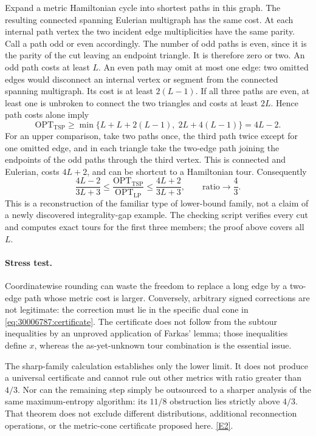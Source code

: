 \documentclass[11pt,a4paper]{article}
\newcommand{\eref}[2]{\hyperlink{extra:#1:#2}{[E#2]}}
\numberwithin{equation}{section}
\begin{document}
Expand a metric Hamiltonian cycle into shortest paths in this graph.
The resulting connected spanning Eulerian multigraph has the same
cost. At each internal path vertex the two incident edge multiplicities
have the same parity. Call a path odd or even accordingly.
The number of odd paths is even, since it is the parity of the cut
leaving an endpoint triangle. It is therefore zero or two.
An odd path costs at least $L$. An even path may omit at most one
edge: two omitted edges would disconnect an internal vertex or segment
from the connected spanning multigraph. Its cost is at least
$2(L-1)$. If all three paths are even, at least one is unbroken to
connect the two triangles and costs at least $2L$. Hence path costs
alone imply
\[
 \mathrm{OPT}_{\mathrm{TSP}}\ge
 \min\{L+L+2(L-1),\;2L+4(L-1)\}=4L-2.
\]
For an upper comparison, take two paths once, the third path twice
except for one omitted edge, and in each triangle take the two-edge
path joining the endpoints of the odd paths through the third vertex.
This is connected and Eulerian, costs $4L+2$, and can be shortcut to
a Hamiltonian tour. Consequently
\begin{equation}\label{eq:30006787:limit}
 \frac{4L-2}{3L+3}\le
 \frac{\mathrm{OPT}_{\mathrm{TSP}}}{\mathrm{OPT}_{\mathrm{LP}}}
 \le\frac{4L+2}{3L+3},\qquad
                         \text{ratio}\longrightarrow\frac43.
\end{equation}
This is a reconstruction of the familiar type of lower-bound family,
not a claim of a newly discovered integrality-gap example. The checking
script verifies every cut and computes exact tours for the first three
members; the proof above covers all $L$.

\paragraph{Stress test.}
Coordinatewise rounding can waste the freedom to replace a long edge
by a two-edge path whose metric cost is larger. Conversely, arbitrary
signed corrections are not legitimate: the correction must lie in the
specific dual cone in \eqref{eq:30006787:certificate}. The certificate does
not follow from the subtour inequalities by an unproved application of
Farkas' lemma; those inequalities define $x$, whereas the as-yet-unknown
tour combination is the essential issue.

The sharp-family calculation establishes only the lower limit. It does
not produce a universal certificate and cannot rule out other metrics
with ratio greater than $4/3$. Nor can the remaining step simply be
outsourced to a sharper analysis of the same maximum-entropy algorithm:
its $11/8$ obstruction lies strictly above $4/3$. That theorem does not
exclude different distributions, additional reconnection operations,
or the metric-cone certificate proposed here. \eref{30006787}{2}.
\end{document}
